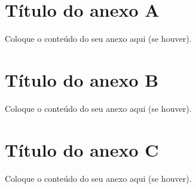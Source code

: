 \begin{anexosenv}

\chapter{Título do anexo A}

Coloque o conteúdo do seu anexo aqui (se houver).


\chapter{Título do anexo B}

Coloque o conteúdo do seu anexo aqui (se houver).

\chapter{Título do anexo C}

Coloque o conteúdo do seu anexo aqui (se houver).




\end{anexosenv}